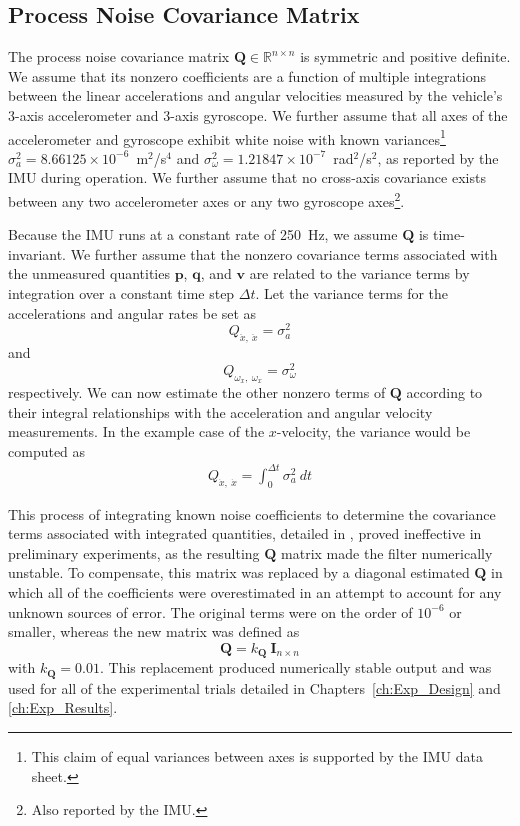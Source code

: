 \subsection{Process Noise Covariance Matrix} \label{sec:Q_Matrix}

The process noise covariance matrix $\mathbf{Q} \in \mathbb{R}^{n \times n}$ is symmetric and positive definite. We assume that its nonzero coefficients are a function of multiple integrations between the linear accelerations and angular velocities measured by the vehicle's 3-axis accelerometer and 3-axis gyroscope. We further assume that all axes of the accelerometer and gyroscope exhibit white noise with known variances\footnote{This claim of equal variances between axes is supported by the IMU data sheet.} $\sigma_{a}^{2} = 8.66125 \times 10^{-6}$~m$^{2}$/s$^{4}$ and $\sigma_{\omega}^{2} = 1.21847 \times 10^{-7}$~rad$^{2}$/s$^{2}$, as reported by the IMU during operation. We further assume that no cross-axis covariance exists between any two accelerometer axes or any two gyroscope axes\footnote{Also reported by the IMU.}.

Because the IMU runs at a constant rate of 250~Hz, we assume $\mathbf{Q}$ is time-invariant. We further assume that the nonzero covariance terms associated with the unmeasured quantities $\mathbf{p}$, $\mathbf{q}$, and $\mathbf{v}$ are related to the variance terms by integration over a constant time step $\Delta t$. Let the variance terms for the accelerations and angular rates be set as
%
\begin{equation}
Q_{\ddot{x},\ \ddot{x}} = \sigma_{a}^{2}
\end{equation}
%
and
%
\begin{equation}
Q_{\omega_{x},\ \omega_{x}} = \sigma_{\omega}^{2}
\end{equation}
%
respectively. We can now estimate the other nonzero terms of $\mathbf{Q}$ according to their integral relationships with the acceleration and angular velocity measurements. In the example case of the $x$-velocity, the variance would be computed as
%
\begin{align}
Q_{\dot{x},\ \dot{x}} = \int^{\Delta t}_{0} \sigma_{a}^2\ dt
\end{align}

This process of integrating known noise coefficients to determine the covariance terms associated with integrated quantities, detailed in \cite{Brown2012}, proved ineffective in preliminary experiments, as the resulting $\mathbf{Q}$ matrix made the filter numerically unstable. To compensate, this matrix was replaced by a diagonal estimated $\mathbf{Q}$ in which all of the coefficients were overestimated in an attempt to account for any unknown sources of error. The original terms were on the order of $10^{-6}$ or smaller, whereas the new matrix was defined as
%
\begin{equation}
\mathbf{Q} = k_{\mathbf{Q}}\ \mathbf{I}_{n \times n}
\end{equation}
%
with $k_{\mathbf{Q}} = 0.01$. This replacement produced numerically stable output and was used for all of the experimental trials detailed in Chapters~\ref{ch:Exp_Design} and \ref{ch:Exp_Results}.


